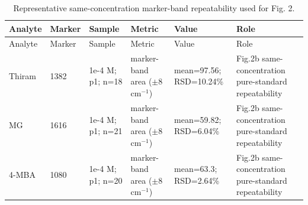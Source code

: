 {\scriptsize
\setlength{\tabcolsep}{2.5pt}
\renewcommand{\arraystretch}{1.08}
\begin{longtable}{L{1.4cm}L{1.25cm}L{2.3cm}L{3.3cm}L{2.2cm}L{4.1cm}}
\caption{Representative same-concentration marker-band repeatability used for Fig. 2.}\label{tab:s8_representative_rsd}\\
\toprule
Analyte & Marker & Sample & Metric & Value & Role \\
\midrule
\endfirsthead
\toprule
Analyte & Marker & Sample & Metric & Value & Role \\
\midrule
\endhead
\endfoot
\bottomrule
\endlastfoot
Thiram & 1382 & 1e-4 M; p1; n=18 & marker-band area ($\pm$8 cm$^{-1}$) & mean=97.56; RSD=10.24\% & Fig.2b same-concentration pure-standard repeatability \\
MG & 1616 & 1e-4 M; p1; n=21 & marker-band area ($\pm$8 cm$^{-1}$) & mean=59.82; RSD=6.04\% & Fig.2b same-concentration pure-standard repeatability \\
4-MBA & 1080 & 1e-4 M; p1; n=20 & marker-band area ($\pm$8 cm$^{-1}$) & mean=63.3; RSD=2.64\% & Fig.2b same-concentration pure-standard repeatability \\
\end{longtable}
}



